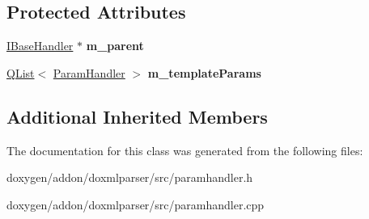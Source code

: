 \subsection*{Protected Attributes}
\begin{DoxyCompactItemize}
\item 
\mbox{\label{class_template_param_list_handler_a110623f362f29fb25579061a059112cb}} 
\mbox{\hyperlink{class_i_base_handler}{I\+Base\+Handler}} $\ast$ {\bfseries m\+\_\+parent}
\item 
\mbox{\label{class_template_param_list_handler_afd9eea40dd51eef37c2e02efae0e78d7}} 
\mbox{\hyperlink{class_q_list}{Q\+List}}$<$ \mbox{\hyperlink{class_param_handler}{Param\+Handler}} $>$ {\bfseries m\+\_\+template\+Params}
\end{DoxyCompactItemize}
\subsection*{Additional Inherited Members}


The documentation for this class was generated from the following files\+:\begin{DoxyCompactItemize}
\item 
doxygen/addon/doxmlparser/src/paramhandler.\+h\item 
doxygen/addon/doxmlparser/src/paramhandler.\+cpp\end{DoxyCompactItemize}
